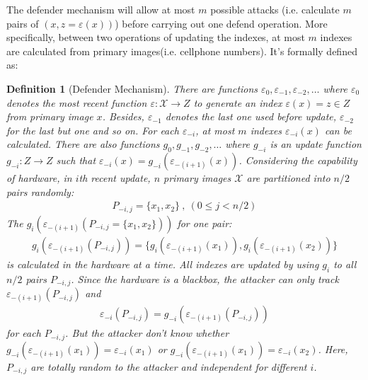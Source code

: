 \documentclass[10pt, conference, compsocconf]{IEEEtran}
\newtheorem{mydef}{Definition}
\begin{document}
        The defender mechanism will allow at most $m$ possible
        attacks (i.e. calculate $m$ pairs of $\left(x, z = \varepsilon(x)\right)$) 
        before carrying out one defend operation. More specifically, between
        two operations of updating the indexes,
        at most $m$ indexes are calculated from primary images(i.e. cellphone numbers).
        It's formally defined as:
        \begin{mydef}[Defender Mechanism]
            There are functions $\varepsilon_0, \varepsilon_{-1}, \varepsilon_{-2}, \ldots$ where
            $\varepsilon_0$ denotes the most recent function $\varepsilon: \mathcal{X} \rightarrow Z$
            to generate an index $\varepsilon(x) = z \in Z$ from primary image $x$.
            Besides, $\varepsilon_{-1}$ denotes the last one used before update, $\varepsilon_{-2}$ 
            for the last but one and so on.
            For each $\varepsilon_{-i}$, at most $m$ indexes $\varepsilon_{-i}(x)$ can be calculated.
            There are also functions $g_0, g_{-1}, g_{-2}, \ldots$ where
            $g_{-i}$ is an update function $g_{-i}: Z \rightarrow Z$ such that
            $\varepsilon_{-i}(x) = g_{-i}\left(\varepsilon_{-(i+1)}(x) \right)$. Considering the capability of hardware,
            in $i$th recent update,
            $n$ primary images $\mathcal X$ are partitioned into $n/2$ pairs randomly:
            \begin{align*}
            	P_{-i, j} = \{x_1, x_2\} ~, ~ (0 \leq j < n/2)
            \end{align*}
            The $g_i\left(\varepsilon_{-(i+1)}(P_{-i, j} = \{x_1, x_2\})\right)$ for one pair:
            \begin{align*}
            	g_i\left(\varepsilon_{-(i+1)}(P_{-i, j})\right) = \{ g_i\left(\varepsilon_{-(i+1)}(x_1)\right),
            		g_i\left(\varepsilon_{-(i+1)}(x_2)\right) \}
            \end{align*}
            is 
            calculated in the hardware at a time. All indexes are updated by using
            $g_i$ to all $n/2$ pairs $P_{-i, j}$.
            Since the hardware is a blackbox, the attacker can only track 
            $\varepsilon_{-(i+1)}(P_{-i, j})$ and
            \begin{align*}
            	\varepsilon_{-i}(P_{-i, j}) = g_{-i}\left( \varepsilon_{-(i+1)}(P_{-i, j}) \right)
            \end{align*}
            for each $P_{-i, j}$.
            But the attacker don't know whether $g_{-i}(\varepsilon_{-(i+1)}(x_1)) = \varepsilon_{-i}(x_1)$ or
            $g_{-i}(\varepsilon_{-(i+1)}(x_1)) = \varepsilon_{-i}(x_2)$.
            Here, $P_{-i, j}$ are totally random
            to the attacker and independent for different $i$.
        \end{mydef}
\end{document}

